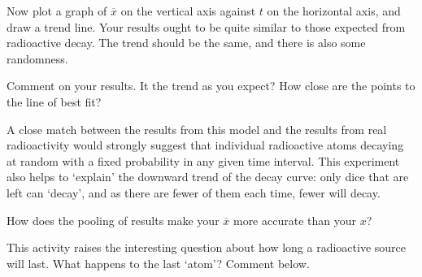 \begin{questions}
\question Now plot a graph of $\overline{x}$ on the vertical axis against $t$ on the horizontal axis, and draw a trend line.  Your results ought to be quite similar to those expected from radioactive decay.  The trend should be the same, and there is also some randomness.

\question Comment on your results.  It the trend as you expect?  How close are the points to the line of best fit? \fillwithlines{3cm}

A close match between the results from this model and the results from real radioactivity would strongly suggest that individual radioactive atoms decaying at random with a fixed probability in any given time interval.  This experiment also helps to `explain' the downward trend of the decay curve: only dice that are left can `decay', and as there are fewer of them each time, fewer will decay.

\question How does the pooling of results make your $\overline{x}$ more accurate than your $x$? \fillwithlines{3cm}

\question This activity raises the interesting question about how long a radioactive source will last.  What happens to the last `atom'?  Comment below.  \fillwithlines{2cm}
\end{questions}
